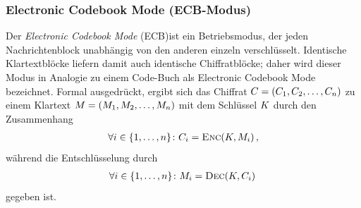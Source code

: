 \subsubsection{Electronic Codebook Mode (ECB-Modus)}
Der \emph{Electronic Codebook Mode} (ECB)\indexECB ist ein Betriebsmodus, der jeden Nachrichtenblock unabhängig von den anderen einzeln verschlüsselt. Identische Klartextblöcke liefern damit auch identische Chiffratblöcke; daher wird dieser Modus in Analogie zu einem
Code-Buch als Electronic Codebook Mode bezeichnet. Formal ausgedrückt, ergibt sich das Chiffrat $C =  (C_{1},C_{2},\dots,C_{n})$ zu einem Klartext $M = (M_{1},M_{2},\dots,M_{n})$ mit dem Schlüssel $K$ durch den Zusammenhang
\begin{align*}
	\forall i \in \{1,\dots,n\}\colon C_{i} = \textsc{Enc}(K,M_{i})\, ,
\end{align*}
während die Entschlüsselung durch
\begin{align*}
	\forall i \in \{1,\dots,n\}\colon M_{i} = \textsc{Dec}(K,C_{i})\, 
\end{align*}
gegeben ist.
